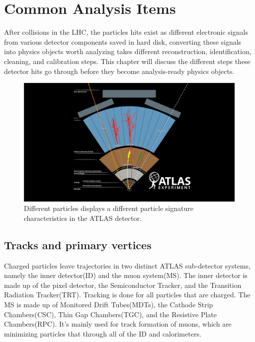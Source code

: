 \chapter{Common Analysis Items}
\label{chapter:CommonAnalysisItems}

After collisions in the LHC, the particles hits exist as different electronic signals from various detector components saved in hard disk, converting these signals into physics objects worth analyzing takes different reconstruction, identification, cleaning, and calibration steps. This chapter will discuss the different steps these detector hits go through before they become analysis-ready physics objects. 

\begin{figure}[!htb]
    \begin{center}
        \includegraphics[width=1.1\textwidth]{figures/common_ana/ParticleSignature}
        \caption{        
            Different particles displays a different particle signature characteristics in the ATLAS detector\cite{Mehlhase:2770815}.
        }
        \label{fig:isolationWP}
    \end{center}
\end{figure}

\section{Tracks and primary vertices}

Charged particles leave trajectories in two distinct ATLAS sub-detector systems, namely the inner detector(ID) and the muon system(MS). The inner detector is made up of the pixel detector, the Semiconductor Tracker, and the Transition Radiation Tracker(TRT). Tracking is done for all particles that are charged. 
The MS is made up of Monitored Drift Tubes(MDTs), the Cathode Strip Chambers(CSC), Thin Gap Chambers(TGC), and the Resistive Plate Chambers(RPC). It's mainly used for
track formation of muons, which are minimizing particles that through all of the ID and calorimeters.


